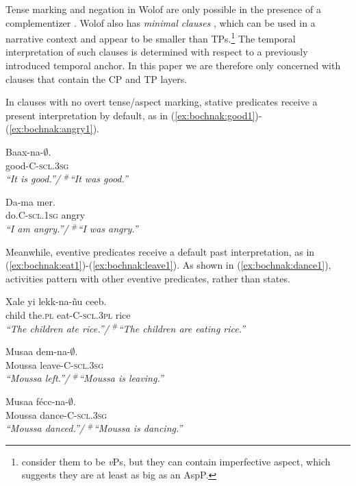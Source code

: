 \documentclass[output=paper]{langsci/langsci}
\begin{document}
 Tense marking and negation in Wolof are only
possible in the presence of a complementizer \citep{Njie1982}. Wolof
also has \textit{minimal clauses} \citep{Sauvageot1965,
  church81systeme,  Dialo1981, robert91approche,
  Zribi-HertzDiagne2003}, which can be used in a narrative context and
appear to be smaller than TPs.\footnote{\cite{Zribi-HertzDiagne2003} consider
them to be \textit{v}Ps, but they can contain imperfective aspect,
which suggests they are at least as big as an AspP.} The temporal interpretation of such
clauses is determined with respect to a previously introduced
temporal anchor. In this paper we
are therefore only concerned with clauses that contain the CP and TP layers.

In clauses with no overt tense/aspect marking, stative predicates receive a present interpretation by default, as in (\ref{ex:bochnak:good1})-(\ref{ex:bochnak:angry1}).

\ea
\gll Baax-na-$\emptyset$.\\
good-C-\textsc{scl.3sg}\\
\glt \textit{``It is good.''/ $^{\#}$``It was good.''}\label{ex:bochnak:good1}
\z

\ea
\gll Da-ma mer.\\
do.C-\textsc{scl.1sg} angry\\
\glt \textit{``I am angry.''/ $^{\#}$``I was angry.''}\label{ex:bochnak:angry1}
\z

Meanwhile, eventive predicates receive a default past interpretation, as in (\ref{ex:bochnak:eat1})-(\ref{ex:bochnak:leave1}). As shown in (\ref{ex:bochnak:dance1}), activities pattern with other eventive predicates, rather than states.

\ea
\gll Xale yi lekk-na-\~nu ceeb.\\
child the.\textsc{pl} eat-C-\textsc{scl.3pl} rice\\
\glt \textit{``The children ate rice.''/ $^{\#}$``The children are eating
  rice.''}\label{ex:bochnak:eat1}
\z
 
\ea
\gll Musaa dem-na-$\emptyset$.\\
Moussa leave-C-\textsc{scl.3sg}\\
\glt \textit{``Moussa left.''/ $^{\#}$``Moussa is leaving.''}\label{ex:bochnak:leave1}
\z

\ea
\gll Musaa f\'ecc-na-$\emptyset$.\\
Moussa dance-C-\textsc{scl.3sg}\\
\glt \textit{``Moussa danced.''/ $^{\#}$``Moussa is dancing.''}\label{ex:bochnak:dance1}
\z
\end{document}
